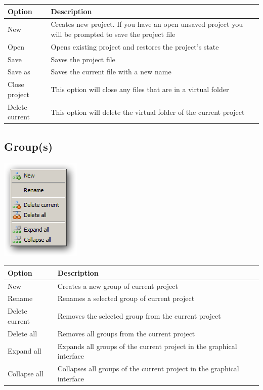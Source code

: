 \begin{scriptsize}\begin{tabularx}{\textwidth}{>{\hsize=0.2\hsize}X>{\hsize=0.8\hsize}X}\\
    \hline
    \textbf{Option} & \textbf{Description} \\
    \hline
    New & Creates new project. If you have an open unsaved project you will be prompted to save the project file \\
    Open & Opens existing project and restores the project's state \\
    Save & Saves the project file \\
    Save as & Saves the current file with a new name \\
    Close project & This option will close any files that are in a virtual folder \\
    Delete current & This option will delete the virtual folder of the current project \\
    \hline
  \end{tabularx}\end{scriptsize}


\hypertarget{menu_project_group}{}
\subsection{Group(s)}

\includegraphics[scale=0.50]{./res/menu_project_group.png}\\

\begin{scriptsize}\begin{tabularx}{\textwidth}{>{\hsize=0.2\hsize}X>{\hsize=0.8\hsize}X}\\
    \hline
    \textbf{Option} & \textbf{Description} \\
    \hline
    New & Creates a new group of current project \\
    Rename & Renames a selected group of current project \\
    Delete current & Removes the selected group from the current project \\
    Delete all & Removes all groups from the current project \\
    Expand all & Expands all groups of the current project in the graphical interface \\
    Collapse all & Collapses all groups of the current project in the graphical interface \\
    \hline
  \end{tabularx}\end{scriptsize}


